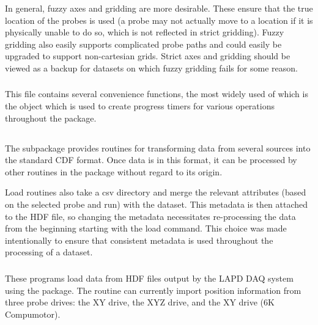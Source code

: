 In general, fuzzy axes and gridding are more desirable. These ensure that the true location of the probes is used (a probe may not actually move to a location if it is physically unable to do so, which is not reflected in strict gridding). Fuzzy gridding also easily supports complicated probe paths and could easily be upgraded to support non-cartesian grids. Strict axes and gridding should be viewed as a backup for datasets on which fuzzy gridding fails for some reason.



\subsubsection{}

This file contains several convenience functions, the most widely used of which is the  object which is used to create progress timers for various operations throughout the package.

\subsection{}

The  subpackage provides routines for transforming data from several sources into the standard CDF format. Once data is in this format, it can be processed by other routines in the package without regard to its origin.

Load routines also take a csv directory and merge the relevant attributes (based on the selected probe and run) with the dataset. This metadata is then attached to the HDF file, so changing the metadata necessitates re-processing the data from the beginning starting with the load command. This choice was made intentionally to ensure that consistent metadata is used throughout the processing of a dataset.

\subsubsection{}

These programs load data from HDF files output by the LAPD DAQ system using the  package. The routine can currently import position information from three probe drives: the XY drive, the XYZ drive, and the XY drive (6K Compumotor). 

